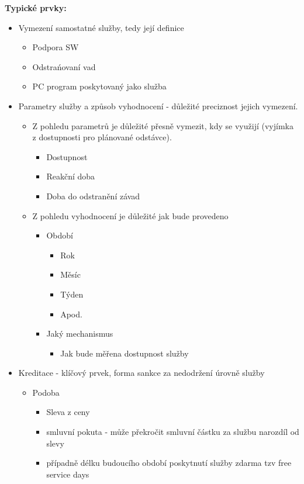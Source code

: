 \documentclass[12pt,a4paper,czech]{article}
\begin{document}
\vspace{0.5cm} 
\noindent\textbf{Typické prvky:}
\begin{itemize}
    \item Vymezení samostatné služby, tedy její definice
    \begin{itemize}
        \item Podpora SW
        \item Odstrańovaní vad
        \item PC program poskytovaný jako služba
    \end{itemize}
    \item Parametry služby a způsob vyhodnocení - důležité preciznost jejich vymezení.
    \begin{itemize}
        \item Z pohledu parametrů je důležité přesně vymezit, kdy se využijí (vyjímka z dostupnosti pro plánované odstávce).
        \begin{itemize}
            \item Dostupnost
            \item Reakční doba
            \item Doba do odstranění závad
        \end{itemize}
        \item  Z pohledu vyhodnocení je důležité jak bude provedeno
        \begin{itemize}
            \item Období
            \begin{itemize}
                \item Rok
                \item Měsíc
                \item Týden
                \item Apod.
            \end{itemize}
            \item Jaký mechanismus
            \begin{itemize}
                \item Jak bude měřena dostupnost služby
            \end{itemize}
        \end{itemize}
    \end{itemize}
    \item Kreditace - klíčový prvek, forma sankce za nedodržení úrovně služby
    \begin{itemize}
        \item Podoba
        \begin{itemize}
            \item  Sleva z ceny
            \item smluvní pokuta - může překročit smluvní částku za službu narozdíl od slevy
            \item případně délku budoucího období poskytnutí služby zdarma tzv free service days
        \end{itemize}
    \end{itemize}
\end{itemize}
\end{document}
